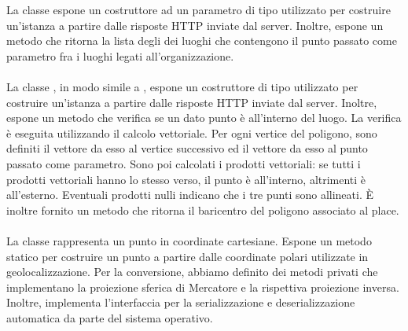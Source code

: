\documentclass[../../manuale-manutentore.tex]{subfiles}
\begin{document}
La classe  espone un costruttore ad un parametro di tipo  utilizzato per costruire un'istanza a partire dalle risposte HTTP inviate dal server.
Inoltre, espone un metodo  che ritorna la lista degli  dei luoghi che contengono il punto passato come parametro fra i luoghi legati all'organizzazione.

\paragraph[Place]{}%
\label{par:place}

La classe , in modo simile a , espone un costruttore di tipo  utilizzato per costruire un'istanza a partire dalle risposte HTTP inviate dal server.
Inoltre, espone un metodo  che verifica se un dato punto è all'interno del luogo.
La verifica è eseguita utilizzando il calcolo vettoriale.
Per ogni vertice del poligono, sono definiti il vettore da esso al vertice successivo ed il vettore da esso al punto passato come parametro.
Sono poi calcolati i prodotti vettoriali: se tutti i prodotti vettoriali hanno lo stesso verso, il punto è all'interno, altrimenti è all'esterno.
Eventuali prodotti nulli indicano che i tre punti sono allineati.
È inoltre fornito un metodo  che ritorna il baricentro del poligono associato al place.

\paragraph[Point]{}%
\label{par:point}

La classe  rappresenta un punto in coordinate cartesiane.
Espone un metodo statico \linebreak{} per costruire un punto a partire dalle coordinate polari utilizzate in geolocalizzazione.
Per la conversione, abbiamo definito dei metodi privati che implementano la proiezione sferica di Mercatore e la rispettiva proiezione inversa.
Inoltre,  implementa l'interfaccia  per la serializzazione e deserializzazione automatica da parte del sistema operativo.

\paragraph[User]{}%
\label{par:app/user}
\end{document}
